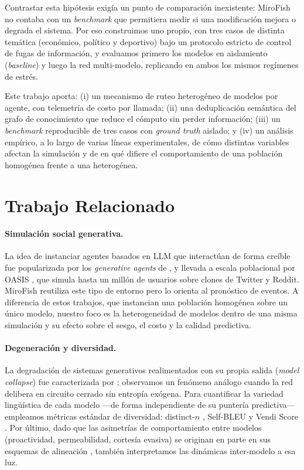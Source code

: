 \documentclass[11pt]{article}
\begin{document}
Contrastar esta hipótesis exigía un punto de comparación inexistente: MiroFish no contaba con un \textit{benchmark} que permitiera medir si una modificación mejora o degrada el sistema. Por eso construimos uno propio, con tres casos de distinta temática (económico, político y deportivo) bajo un protocolo estricto de control de fugas de información, y evaluamos primero los modelos en aislamiento (\textit{baseline}) y luego la red multi-modelo, replicando en ambos los mismos regímenes de estrés.

Este trabajo aporta: (i) un mecanismo de ruteo heterogéneo de modelos por agente, con telemetría de costo por llamada; (ii) una deduplicación semántica del grafo de conocimiento que reduce el cómputo sin perder información; (iii) un \textit{benchmark} reproducible de tres casos con \textit{ground truth} aislado; y (iv) un análisis empírico, a lo largo de varias líneas experimentales, de cómo distintas variables afectan la simulación y de en qué difiere el comportamiento de una población homogénea frente a una heterogénea.

\section{Trabajo Relacionado}
\label{sec:related}

\paragraph{Simulación social generativa.} La idea de instanciar agentes basados en LLM que interactúan de forma creíble fue popularizada por los \textit{generative agents} de \citet{park2023generative}, y llevada a escala poblacional por OASIS \citep{yang2024oasis}, que simula hasta un millón de usuarios sobre clones de Twitter y Reddit. MiroFish \citep{mirofish2025} reutiliza este tipo de entorno pero lo orienta al pronóstico de eventos. A diferencia de estos trabajos, que instancian una población homogénea sobre un único modelo, nuestro foco es la heterogeneidad de modelos dentro de una misma simulación y su efecto sobre el sesgo, el costo y la calidad predictiva.

\paragraph{Degeneración y diversidad.} La degradación de sistemas generativos realimentados con su propia salida (\textit{model collapse}) fue caracterizada por \citet{shumailov2024collapse}; observamos un fenómeno análogo cuando la red delibera en circuito cerrado sin entropía exógena. Para cuantificar la variedad lingüística de cada modelo —de forma independiente de su puntería predictiva— empleamos métricas estándar de diversidad: distinct-$n$ \citep{li2016diversity}, Self-BLEU \citep{zhu2018texygen} y Vendi Score \citep{friedman2023vendi}. Por último, dado que las asimetrías de comportamiento entre modelos (proactividad, permeabilidad, cortesía evasiva) se originan en parte en sus esquemas de alineación \citep{ouyang2022instructgpt}, también interpretamos las dinámicas inter-modelo a esa luz.
\end{document}
